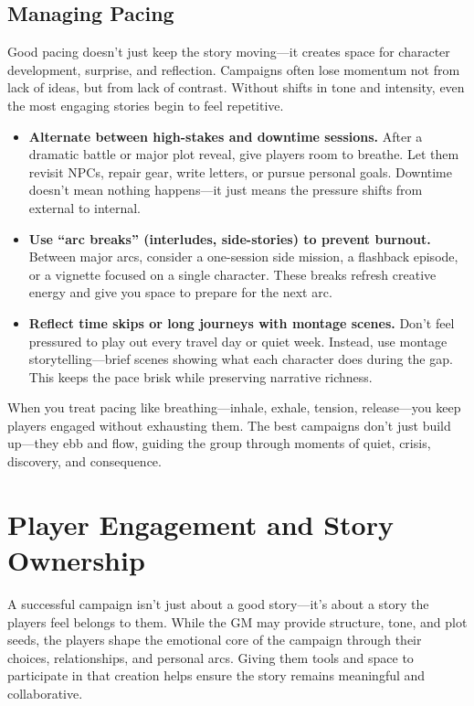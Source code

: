 \subsection*{Managing Pacing}

Good pacing doesn’t just keep the story moving—it creates space for character development, surprise, and reflection. Campaigns often lose momentum not from lack of ideas, but from lack of contrast. Without shifts in tone and intensity, even the most engaging stories begin to feel repetitive.

\newcolumn
\begin{itemize}
    \item \textbf{Alternate between high-stakes and downtime sessions.}  
    After a dramatic battle or major plot reveal, give players room to breathe. Let them revisit NPCs, repair gear, write letters, or pursue personal goals. Downtime doesn’t mean nothing happens—it just means the pressure shifts from external to internal.

    \item \textbf{Use “arc breaks” (interludes, side-stories) to prevent burnout.}  
    Between major arcs, consider a one-session side mission, a flashback episode, or a vignette focused on a single character. These breaks refresh creative energy and give you space to prepare for the next arc.

    \item \textbf{Reflect time skips or long journeys with montage scenes.}  
    Don’t feel pressured to play out every travel day or quiet week. Instead, use montage storytelling—brief scenes showing what each character does during the gap. This keeps the pace brisk while preserving narrative richness.
\end{itemize}

When you treat pacing like breathing—inhale, exhale, tension, release—you keep players engaged without exhausting them. The best campaigns don’t just build up—they ebb and flow, guiding the group through moments of quiet, crisis, discovery, and consequence.



\section{Player Engagement and Story Ownership}

A successful campaign isn’t just about a good story—it’s about a story the players feel belongs to them. While the GM may provide structure, tone, and plot seeds, the players shape the emotional core of the campaign through their choices, relationships, and personal arcs. Giving them tools and space to participate in that creation helps ensure the story remains meaningful and collaborative.

